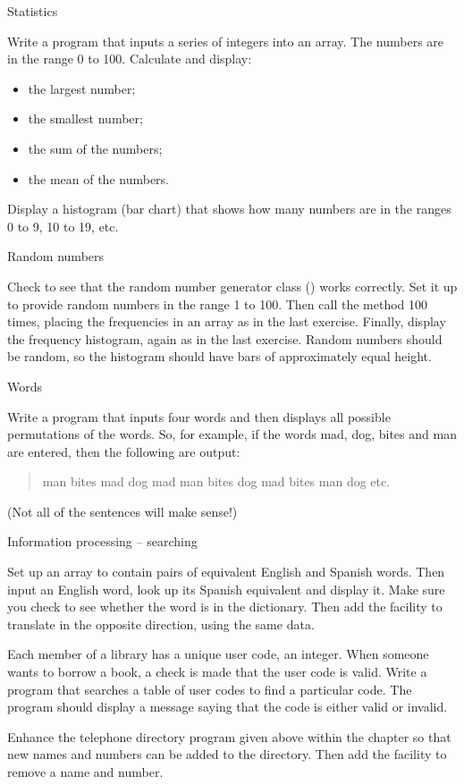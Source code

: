 			Statistics
			\begin{EXE}
				\item	Write a program that inputs a series of integers into an array. The numbers are in the range 0 to 100.
					Calculate and display:
					\begin{itemize}
			      \item the largest number;
      			\item the smallest number;
			      \item the sum of the numbers;
			      \item the mean of the numbers.
					\end{itemize}
					Display a histogram (bar chart) that shows how many numbers are in the ranges 0 to 9, 10 to 19, etc.
			\end{EXE}
			
			Random numbers
			\begin{EXE}
				\item	Check to see that the random number generator class () works correctly. Set it up to provide random numbers in the range 1 to 100. Then call the method 100 times, placing the frequencies in an array as in the last exercise. Finally, display the frequency histogram, again as in the last exercise. Random numbers should be random, so the histogram should have bars of approximately equal height.
			\end{EXE}
			
			Words
			\begin{EXE}
			\item	{} Write a program that inputs four words and then displays all possible permutations of the words. So, for example, if the words mad, dog, bites and man are entered, then the following are output:
					\begin{quote}
						man bites mad dog
						mad man bites dog
						mad bites man dog
						etc.
					\end{quote}
					(Not all of the sentences will make sense!)
			\end{EXE}
			
			Information processing – searching
			\begin{EXE}
				\item {} Set up an array to contain pairs of equivalent English and Spanish words. Then input an English word, look up its Spanish equivalent and display it. Make sure you check to see whether the word is in the dictionary. Then add the facility to translate in the opposite direction, using the same data.
				\item	{} Each member of a library has a unique user code, an integer. When someone wants to borrow a book, a check is made that the user code is valid.
					Write a program that searches a table of user codes to find a particular code. The program should display a message saying that the code is either valid or invalid.
				\item	{} Enhance the telephone directory program given above within the chapter so that new names and numbers can be added to the directory. Then add the facility to remove a name and number.
			\end{EXE}
			
